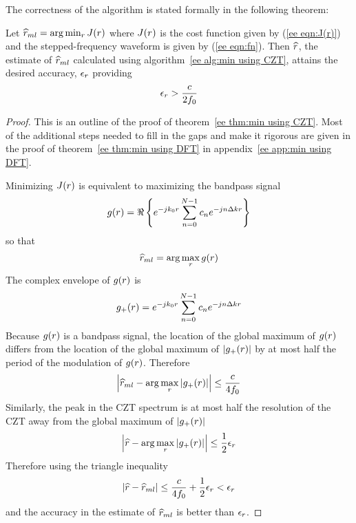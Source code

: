 The correctness of the algorithm is stated formally in the following
theorem:

\begin{theorem}
\label{ee thm:min using CZT}\mbox{}\par

Let $\widehat{r}_{ml}=\arg\min_{{r}}J({r})$ where $J({r})$ is the cost function given by
(\ref{ee eqn:J(r)}) and the stepped-frequency waveform is given by
(\ref{ee eqn:fn}).  Then $\widehat{r}$, the estimate of $\widehat{r}_{ml}$ calculated
using algorithm~\ref{ee alg:min using CZT}, attains the desired accuracy,
$\epsilon_{{r}}$ providing
\begin{equation}
\epsilon_{{r}} > \frac{c}{2f_0}
\end{equation}
\end{theorem}

\begin{proof}
This is an outline of the proof of theorem~\ref{ee thm:min using CZT}.  Most of
the additional steps needed to fill in the gaps and make it rigorous 
are given in the proof of theorem~\ref{ee thm:min using DFT} in 
appendix~\ref{ee app:min using DFT}.

Minimizing $J({r})$ is equivalent to maximizing the bandpass signal 
\begin{equation}
g({r})=\Re\left\{{e^{-jk_0{r}}}\sum_{n=0}^{N-1}c_n{e^{-jn\Delta k{r}}}\right\}
\end{equation}
so that
\begin{equation}
\widehat{r}_{ml}=\arg\max_{{r}}g({r})
\end{equation}
The complex envelope of $g({r})$ is
\begin{equation}
g_{+}({r})={e^{-jk_0{r}}}\sum_{n=0}^{N-1}c_n{e^{-jn\Delta k{r}}}
\end{equation}
Because $g({r})$ is a bandpass signal, the location of the global maximum of
$g({r})$ differs from the location of the global maximum of
$\left|g_{+}({r})\right|$ by at most half the period of the modulation of
$g({r})$.  Therefore
\begin{equation}
\left|\widehat{r}_{ml}-\arg\max_{{r}}\left|g_{+}({r})\right|\right|\leq\frac{c}{4f_0}
\end{equation}
Similarly, the peak in the CZT spectrum is at most half the resolution of
the CZT away from the global maximum of $\left|g_{+}({r})\right|$
\begin{equation}
\left|\widehat{r}-\arg\max_{{r}}\left|g_{+}({r})\right|\right|\leq\frac{1}{2}
\epsilon_{{r}}
\end{equation}
Therefore using the triangle inequality
\begin{equation}
\left|\widehat{r}-\widehat{r}_{ml}\right|\leq \frac{c}{4f_0}+\frac{1}{2}\epsilon_{{r}}
<\epsilon_{{r}}
\end{equation}
and the accuracy in the estimate of $\widehat{r}_{ml}$ is better than $\epsilon_{{r}}$.
\end{proof}


